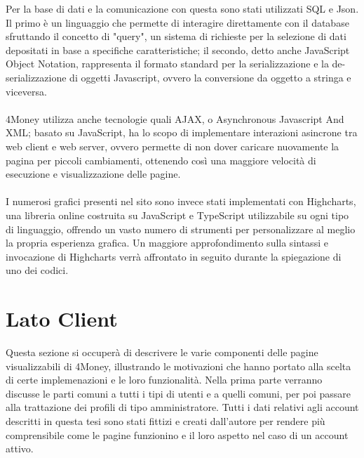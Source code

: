 \documentclass[binding=0.6cm, oneside, noexaminfo, italian]{sapthesis}
\begin{document}
Per la base di dati e la comunicazione con questa sono stati utilizzati SQL e Json. Il primo è un linguaggio che permette di interagire direttamente con il database sfruttando il concetto di "query", un sistema di richieste per la selezione di dati depositati in base a specifiche caratteristiche; il secondo, detto anche JavaScript Object Notation, rappresenta il formato standard per la serializzazione e la de-serializzazione di oggetti Javascript, ovvero la conversione da oggetto a stringa e viceversa. \\ \\
4Money utilizza anche tecnologie quali AJAX, o Asynchronous Javascript And XML; basato su JavaScript, ha lo scopo di implementare interazioni asincrone tra web client e web server, ovvero permette di non dover caricare nuovamente la pagina per piccoli cambiamenti, ottenendo così una maggiore velocità di esecuzione e visualizzazione delle pagine. \\ \\
I numerosi grafici presenti nel sito sono invece stati implementati con Highcharts, una libreria online costruita su JavaScript e TypeScript utilizzabile su ogni tipo di linguaggio, offrendo un vasto numero di strumenti per personalizzare al meglio la propria esperienza grafica. Un maggiore approfondimento sulla sintassi e invocazione di Highcharts verrà affrontato in seguito durante la spiegazione di uno dei codici.

\newpage
\section{Lato Client}
Questa sezione si occuperà di descrivere le varie componenti delle pagine visualizzabili di 4Money, illustrando le motivazioni che hanno portato alla scelta di certe implemenazioni e le loro funzionalità. Nella prima parte verranno discusse le parti comuni a tutti i tipi di utenti e a quelli comuni, per poi passare alla trattazione dei profili di tipo amministratore. Tutti i dati relativi agli account descritti in questa tesi sono stati fittizi e creati dall'autore per rendere più comprensibile come le pagine funzionino e il loro aspetto nel caso di un account attivo.
\end{document}
